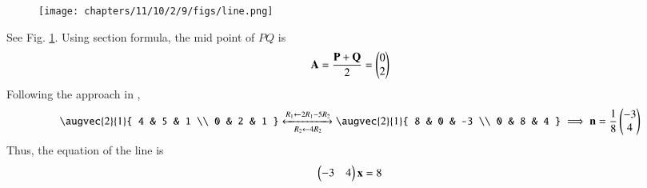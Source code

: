 	\begin{figure}[H]
		\centering
 \texttt{[image: chapters/11/10/2/9/figs/line.png]}
		\caption{}
		\label{fig:11/10/2/9}
  	\end{figure}
	See Fig. 
		\ref{fig:11/10/2/9}.
Using section formula, the mid point of $PQ$ is
\begin{align}
\mathbf{A} = \frac{\mathbf{P} +\mathbf{Q} }{2}
	= {\begin{pmatrix}0\\2\end{pmatrix}}
\end{align} 
Following the approach in ,
\begin{align*}
	\augvec{2}{1}{ 
	4 & 5 & 1
	\\  
	0 & 2 & 1
	}
	\xleftrightarrow[R_2 \leftarrow 4R_2 ]{R_1 \leftarrow 2R_1 -5R_2}
	\augvec{2}{1}{ 
	8 & 0 & -3 
	\\ 
	0 & 8 & 4 
	}
	\implies \vec{n} = \frac{1}{8}\myvec{ -3 \\ 4}
\end{align*}
Thus,
the equation of the line is 
\begin{align}
	\begin{pmatrix}-3 & 4\end{pmatrix}\mathbf{x} =8 
\end{align}
